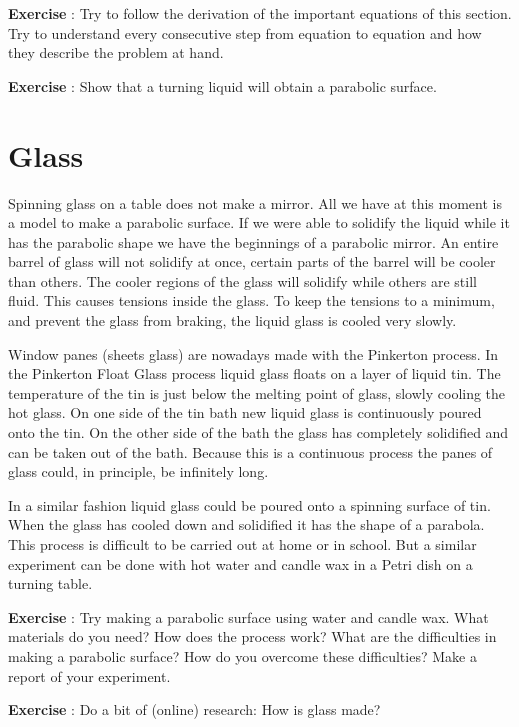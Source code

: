 \documentclass[12pt,a4paper]{article}
\numberwithin{equation}{section}
\numberwithin{figure}{section}
\newcounter{Exercise}
\numberwithin{table}{section}
\begin{document}
\begin{shaded}
\textbf{Exercise \theExercise {}} : Try to follow the derivation of the important equations of this section. Try to understand every consecutive step from equation to equation and how they describe the problem at hand.\end{shaded}
\begin{shaded}
\textbf{Exercise \theExercise {}} : Show that a turning liquid will obtain a parabolic surface.\end{shaded}

\section{Glass}
Spinning glass on a table does not make a mirror. All we have at this moment is a model to make a parabolic surface. If we were able to solidify the liquid while it has the parabolic shape we have the beginnings of a parabolic mirror. An entire barrel of glass will not solidify at once, certain parts of the barrel will be cooler than others. The cooler regions of the glass will solidify while others are still fluid. This causes tensions inside the glass. To keep the tensions to a minimum, and prevent the glass from braking, the liquid glass is cooled very slowly.

Window panes (sheets glass) are nowadays made with the Pinkerton process. In the Pinkerton Float Glass process liquid glass floats on a layer of liquid tin. The temperature of the tin is just below the melting point of glass, slowly cooling the hot glass. On one side of the tin bath new liquid glass is continuously poured onto the tin. On the other side of the bath the glass has completely solidified and can be taken out of the bath. Because this is a continuous process the panes of glass could, in principle, be infinitely long.

In a similar fashion liquid glass could be poured onto a spinning surface of tin. When the glass has cooled down and solidified it has the shape of a parabola. This process is difficult to be carried out at home or in school. But a similar experiment can be done with hot water and candle wax in a Petri dish on a turning table. 

\begin{shaded}
\textbf{Exercise \theExercise {}} : Try making a parabolic surface using water and candle wax. What materials do you need? How does the process work? What are the difficulties in making a parabolic surface? How do you overcome these difficulties? Make a report of your experiment.\end{shaded}
\begin{shaded}
\textbf{Exercise \theExercise {}} : Do a bit of (online) research: How is glass made?\end{shaded}
\end{document}
